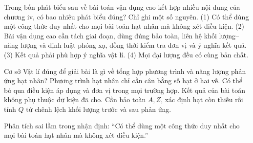 \begin{ex}
Trong bốn phát biểu sau về bài toán vận dụng cao kết hợp nhiều nội dung của chương iv, có bao nhiêu phát biểu đúng? Chỉ ghi một số nguyên. (1) Có thể dùng một công thức duy nhất cho mọi bài toán hạt nhân mà không xét điều kiện. (2) Bài vận dụng cao cần tách giai đoạn, dùng đúng bảo toàn, liên hệ khối lượng–năng lượng và định luật phóng xạ, đồng thời kiểm tra đơn vị và ý nghĩa kết quả. (3) Kết quả phải phù hợp ý nghĩa vật lí. (4) Mọi đại lượng đều có cùng bản chất.
\end{ex}

\begin{ex}
Cơ sở Vật lí đúng để giải bài là gì về tổng hợp phương trình và năng lượng phản ứng hạt nhân?
\choice
{Phương trình hạt nhân chỉ cần cân bằng số hạt ở hai vế.}
{Có thể bỏ qua điều kiện áp dụng và đơn vị trong mọi trường hợp.}
{Kết quả của bài toán không phụ thuộc dữ kiện đã cho.}
{\True Cần bảo toàn $A,Z$, xác định hạt còn thiếu rồi tính $Q$ từ chênh lệch khối lượng trước và sau phản ứng.}
\end{ex}

\begin{bt}
Phân tích sai lầm trong nhận định: “Có thể dùng một công thức duy nhất cho mọi bài toán hạt nhân mà không xét điều kiện.”
\end{bt}

